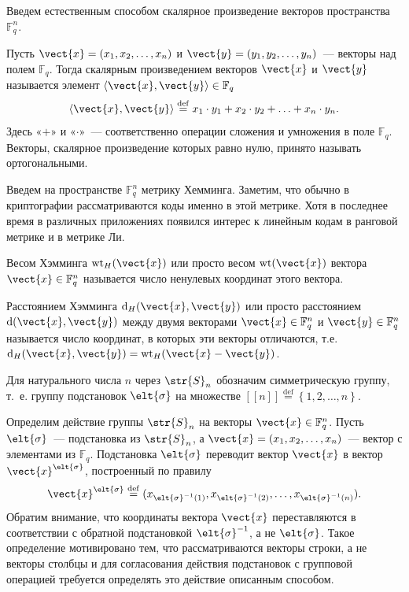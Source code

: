 \documentclass{cmcmsuthesis-phd}
\begin{document}
Введем естественным способом скалярное произведение векторов пространства \(\mathbb{F}^n_q\).

Пусть \(\vect{x}=(x_1,x_2,\ldots, x_n)\) и \(\vect{y}=(y_1,y_2,\ldots,y_n)\)~--- векторы над полем \(\mathbb{F}_q\).
Тогда скалярным произведением векторов \(\vect{x}\) и \(\vect{y}\) называется элемент \(\left\langle \vect{x}, \vect{y} \right\rangle\in \mathbb{F}_q\)
\[
\left\langle\vect{x}, \vect{y}\right\rangle
\stackrel{\mathrm{def}}{=} x_1\cdot y_1 + x_2\cdot y_2 + \ldots + x_n\cdot y_n.
\]
Здесь «\(+\)» и «\(\cdot\)»~--- соответственно операции сложения и умножения в поле \(\mathbb{F}_q\).
Векторы, скалярное произведение которых равно нулю, принято называть ортогональными.

Введем на пространстве \(\mathbb{F}^n_q\) метрику Хемминга.
Заметим, что обычно в криптографии рассматриваются коды именно в этой метрике.
Хотя в последнее время в различных приложениях появился интерес к линейным кодам в ранговой метрике и в метрике Ли.

Весом Хэмминга \(\operatorname{wt}_H(\vect{x})\) или просто весом \(\operatorname{wt}(\vect{x})\) вектора \(\vect{x}\in \mathbb{F}^n_q\) называется число ненулевых координат этого вектора.

Расстоянием Хэмминга \(\operatorname{d}_H(\vect{x},\vect{y})\) или просто расстоянием \(\operatorname{d}(\vect{x},\vect{y})\) между двумя векторами \(\vect{x}\in \mathbb{F}^n_q\) и \(\vect{y}\in \mathbb{F}^n_q\) называется число координат, в которых эти векторы отличаются, т.е. \(\operatorname{d}_H(\vect{x},\vect{y})=\operatorname{wt}_H(\vect{x}-\vect{y})\).

Для натурального числа \(n\) через \(\str{S}_{n}\) обозначим симметрическую группу, т.~е. группу подстановок \(\elt{\sigma}\) на множестве \([\![n]\!] \stackrel{\mathrm{def}}{=} \left\{1,2, \dotsc, n\right\}\).

Определим действие группы \(\str{S}_{n}\) на векторы \(\vect{x}\in \mathbb{F}^{n}_{q}\).
Пусть \(\elt{\sigma}\)~--- подстановка из \(\str{S}_{n}\), а \(\vect{x}=(x_1,x_2,\ldots,x_n)\)~--- вектор с элементами из \(\mathbb{F}_q\).
Подстановка \(\elt{\sigma}\) переводит вектор \(\vect{x}\) в вектор \(\vect{x}^{\elt{\sigma}}\), построенный по правилу
\[\vect{x}^{\elt{\sigma}}\stackrel{\mathrm{def}}{=}(x_{\elt{\sigma}^{-1}(1)},x_{\elt{\sigma}^{-1}(2)},\ldots,x_{\elt{\sigma}^{-1}(n)}).\]
Обратим внимание, что координаты вектора \(\vect{x}\) переставляются в соответствии с обратной подстановкой \(\elt{\sigma}^{-1}\), а не \(\elt{\sigma}\).
Такое определение мотивировано тем, что рассматриваются векторы строки, а не векторы столбцы и для согласования действия подстановок с групповой операцией требуется определять это действие описанным способом.
\end{document}
